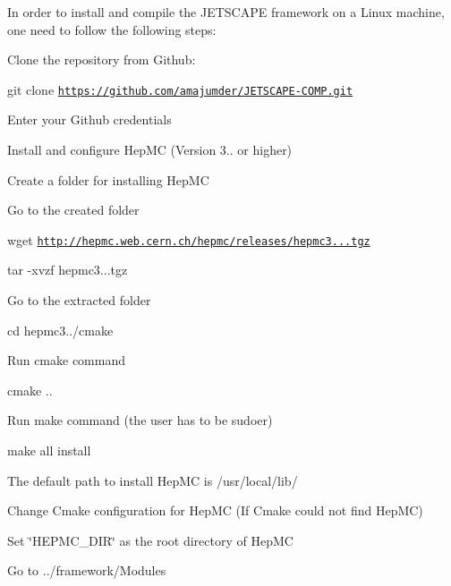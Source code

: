 In order to install and compile the J\+E\+T\+S\+C\+A\+PE framework on a Linux machine, one need to follow the following steps\+:


\begin{DoxyEnumerate}
\item Clone the repository from Github\+:
\begin{DoxyItemize}
\item git clone \href{https://github.com/amajumder/JETSCAPE-COMP.git}{\tt https\+://github.\+com/amajumder/\+J\+E\+T\+S\+C\+A\+P\+E-\/\+C\+O\+M\+P.\+git}
\item Enter your Github credentials
\end{DoxyItemize}
\item Install and configure Hep\+MC (Version 3.. or higher)
\begin{DoxyItemize}
\item Create a folder for installing Hep\+MC
\item Go to the created folder
\item wget \href{http://hepmc.web.cern.ch/hepmc/releases/hepmc3.0.0.tgz}{\tt http\+://hepmc.\+web.\+cern.\+ch/hepmc/releases/hepmc3...\+tgz}
\item tar -\/xvzf hepmc3...\+tgz
\item Go to the extracted folder
\begin{DoxyItemize}
\item cd hepmc3../cmake
\end{DoxyItemize}
\item Run cmake command
\begin{DoxyItemize}
\item cmake ..
\end{DoxyItemize}
\item Run make command (the user has to be sudoer)
\begin{DoxyItemize}
\item make all install
\end{DoxyItemize}
\item The default path to install Hep\+MC is /usr/local/lib/
\end{DoxyItemize}
\item Change Cmake configuration for Hep\+MC (If Cmake could not find Hep\+MC)
\begin{DoxyItemize}
\item Set \char`\"{}\+H\+E\+P\+M\+C\+\_\+\+D\+I\+R\char`\"{} as the root directory of Hep\+MC
\item Go to ../framework/\+Modules

\end{DoxyItemize}
\end{DoxyEnumerate}
